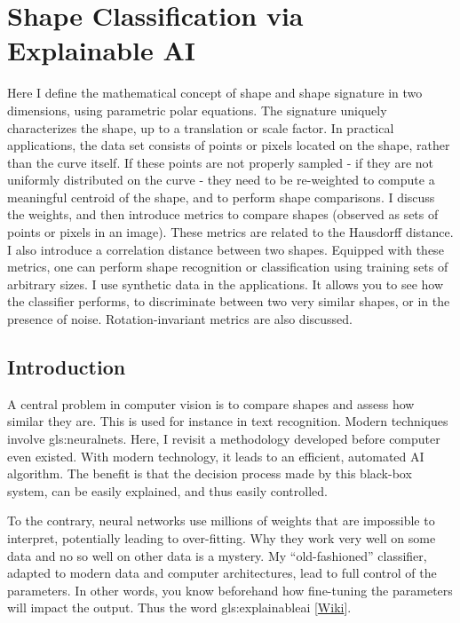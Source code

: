 \documentclass[oneside,10pt]{book}
\newcommand\Chapter[2]{
  \chapter[#1]{#1\\[2ex]\Large\itshape#2}
}
\begin{document}
\Chapter{Shape Classification via Explainable AI}{}\label{chaptershapes}

Here I define the mathematical concept of shape and shape signature in two dimensions, using parametric polar equations. The signature uniquely characterizes the shape, up to a translation or scale factor. In practical applications, the data set consists of points or pixels located on the shape, rather than the curve itself. If these points are not properly sampled - if they are not uniformly distributed on the curve - they need to be re-weighted to compute a meaningful centroid of the shape, and to perform shape comparisons. I discuss the weights, and then introduce metrics to compare shapes (observed as sets of points or pixels in an image). These metrics are related to the Hausdorff distance. I also introduce a correlation distance between two shapes. Equipped with these metrics, one can perform shape recognition or classification using training sets of arbitrary sizes. I use synthetic data in the applications. It allows you to see how the classifier performs, to discriminate between two very similar shapes, or in the presence of noise. Rotation-invariant metrics are also discussed.


\hypersetup{linkcolor=red}

\section{Introduction}

A central problem in \textcolor{index}{computer vision} is to compare shapes and assess how similar they are. This is used for instance in text recognition. Modern techniques involve \glspl{gls:neuralnet}. Here, I revisit a methodology developed before computer even existed. With modern technology, it leads to an efficient, automated AI algorithm. The benefit is that the decision process made by this black-box system, can be easily explained, and thus easily controlled.

To the contrary, neural networks use millions of weights that are impossible to interpret, potentially leading to over-fitting. Why they work very well on some data and no so well on other data is a mystery. My “old-fashioned” classifier, adapted to modern data and computer architectures, lead to full control of the parameters. In other words, you know beforehand how fine-tuning the parameters will impact the output. Thus the word \gls{gls:explainableai} [\href{https://en.wikipedia.org/wiki/Explainable_artificial_intelligence}{Wiki}].
\end{document}
